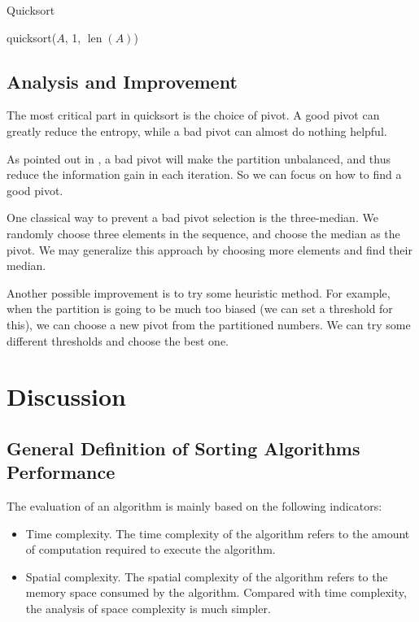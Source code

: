\documentclass[12pt]{extarticle}
\newcommand{\<}{\langle}
\renewcommand{\>}{\rangle}
\theoremstyle{definition}
\begin{document}
\begin{algorithm}[H]
	\caption{Quicksort}
	\label{algo:quicksort_original_wrap}
	\LinesNumbered
	{\con quicksort($A$, 1, $\operatorname{len}(A)$)}
\end{algorithm}

\subsection{Analysis and Improvement}

The most critical part in quicksort is the choice of pivot. A good pivot can greatly reduce the entropy, while a bad pivot can almost do nothing helpful.

As pointed out in \cite{mackay1}, a bad pivot will make the partition unbalanced, and thus reduce the information gain in each iteration. So we can focus on how to find a good pivot. 

One classical way to prevent a bad pivot selection is the three-median. We randomly choose three elements in the sequence, and choose the median as the pivot. We may generalize this approach by choosing more elements and find their median. 

Another possible improvement is to try some heuristic method. For example, when the partition is going to be much too biased (we can set a threshold for this), we can choose a new pivot from the partitioned numbers. We can try some different thresholds and choose the best one.

\section{Discussion}

\subsection{General Definition of Sorting Algorithms Performance}

The evaluation of an algorithm is mainly based on the following indicators:

\begin{itemize}
	\item Time complexity. The time complexity of the algorithm refers to the amount of computation required to execute the algorithm.
	\item Spatial complexity. The spatial complexity of the algorithm refers to the memory space consumed by the algorithm. Compared with time complexity, the analysis of space complexity is much simpler.
\end{itemize}
\end{document}
